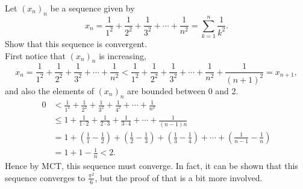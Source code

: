 \documentclass[../real_analysis.tex]{subfiles}
\begin{document}
        \begin{example}
            Let $(x_n)_n$ be a sequence given by
            \begin{equation}
                x_n=\frac{1}{1^2}+\frac{1}{2^2}+\frac{1}{3^2}+\cdots+\frac{1}{n^2}=\sum_{k=1}^n\frac{1}{k^2}.
            \end{equation}
            Show that this sequence is convergent.\\
            First notice that $(x_n)_n$ is increasing,
            \begin{equation}
                x_n=\frac{1}{1^2}+\frac{1}{2^2}+\frac{1}{3^2}+\cdots+\frac{1}{n^2}<\frac{1}{1^2}+\frac{1}{2^2}+\frac{1}{3^2}+\cdots+\frac{1}{n^2}+\frac{1}{(n+1)^2}=x_{n+1},
            \end{equation}
            and also the elements of $(x_n)_n$ are bounded between 0 and 2.
            \begin{align}
                0&<\frac{1}{1^2}+\frac{1}{2^2}+\frac{1}{3^2}+\frac{1}{4^2}+\cdots+\frac{1}{n^2}\\
                &\leq1+\frac{1}{1\cdot2}+\frac{1}{2\cdot3}+\frac{1}{3\cdot4}+\cdots+\frac{1}{(n-1)n}\\
                &=1+\left(\frac{1}{1}-\frac{1}{2}\right)+\left(\frac{1}{2}-\frac{1}{3}\right)+\left(\frac{1}{3}-\frac{1}{4}\right)+\cdots+\left(\frac{1}{n-1}-\frac{1}{n}\right)\\
                &=1+1-\frac{1}{n}<2.
            \end{align}
            Hence by MCT, this sequence must converge.
            In fact, it can be shown that this sequence converges to $\frac{\pi^2}{6}$, but the proof of that is a bit more involved.
        \end{example}
\end{document}
